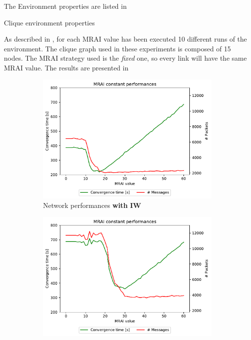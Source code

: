 The Environment properties are listed in 

\begin{table}[h]
	
	\caption{Clique environment properties}
    \label{tbl:clique_properties}
\end{table}

As described in , for each \ac{MRAI} value has been
executed \num{10} different runs of the environment.
The clique graph used in these experiments is composed of \num{15} nodes.
The \ac{MRAI} strategy used is the \textit{fixed} one, so every link will have the
same \ac{MRAI} value.
The results are presented in 

\begin{figure}[h]
     \centering
     \begin{subfigure}[b]{0.45\textwidth}
         \centering
         \includegraphics[width=\textwidth]{images/clique/messagesVStime/pareto-clique-constant_mrai_evolution.pdf}
		 \caption{Network performances \textbf{with} \textbf{\ac{IW}}}
         \label{fig:clique_evolution_IW}
     \end{subfigure}
     \hfill
     \begin{subfigure}[b]{0.45\textwidth}
         \centering
         \includegraphics[width=\textwidth]{images/clique/messagesVStime/pareto-clique-noIW-constant_mrai_evolution.pdf}

\end{subfigure}
\end{figure}
